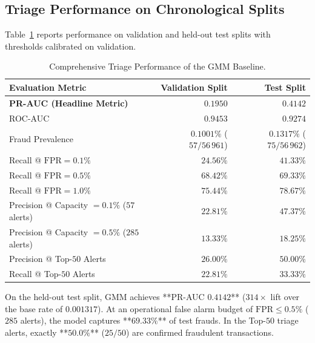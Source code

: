 \subsection{Triage Performance on Chronological Splits}
Table~\ref{tab:gmm_metrics} reports performance on validation and held-out test splits with thresholds calibrated on validation.

\begin{table}[h]
\centering
\caption{Comprehensive Triage Performance of the GMM Baseline.}
\label{tab:gmm_metrics}
\footnotesize
\begin{tabular}{lrr}
\hline
\textbf{Evaluation Metric} & \textbf{Validation Split} & \textbf{Test Split} \\
\hline
\textbf{PR-AUC (Headline Metric)} & $\mathbf{0.1950}$ & $\mathbf{0.4142}$ \\
ROC-AUC & $0.9453$ & $0.9274$ \\
Fraud Prevalence & $0.1001\%$ ($57 / 56\,961$) & $0.1317\%$ ($75 / 56\,962$) \\
\hline
Recall @ $\text{FPR} = 0.1\%$ & $24.56\%$ & $41.33\%$ \\
Recall @ $\text{FPR} = 0.5\%$ & $68.42\%$ & $69.33\%$ \\
Recall @ $\text{FPR} = 1.0\%$ & $75.44\%$ & $78.67\%$ \\
\hline
Precision @ Capacity $= 0.1\%$ ($57$ alerts) & $22.81\%$ & $47.37\%$ \\
Precision @ Capacity $= 0.5\%$ ($285$ alerts) & $13.33\%$ & $18.25\%$ \\
Precision @ Top-$50$ Alerts & $26.00\%$ & $\mathbf{50.00\%}$ \\
Recall @ Top-$50$ Alerts & $22.81\%$ & $33.33\%$ \\
\hline
\end{tabular}
\end{table}

On the held-out test split, GMM achieves **PR-AUC $0.4142$** ($314\times$ lift over the base rate of $0.001317$). At an operational false alarm budget of $\text{FPR} \le 0.5\%$ ($285$ alerts), the model captures **$69.33\%$** of test frauds. In the Top-$50$ triage alerts, exactly **$50.0\%$** ($25/50$) are confirmed fraudulent transactions.

